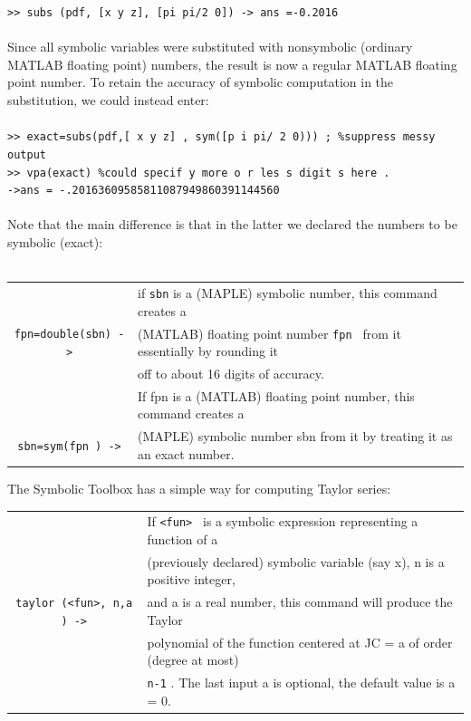 \documentclass[../main.tex]{subfiles}
\begin{document}
\texttt{>> subs (pdf, [x y z], [pi pi/2 0]) -> ans =-0.2016 }
\\
\\
Since all symbolic variables were substituted with nonsymbolic (ordinary 
MATLAB floating point) numbers, the result is now a regular MATLAB floating 
point number. To retain the accuracy of symbolic computation in the substitution, 
we could instead enter: 
\\
\\
\texttt{>> exact=subs(pdf,[ x y z] , sym([p i pi/ 2 0))) ; \%suppress messy output }\\
\texttt{>> vpa(exact) \%could specif y more o r les s digit s here . }\\
\texttt{->ans = -.20163609585811087949860391144560 }
\\
\\
Note that the main difference is that in the latter we declared the numbers to be 
symbolic (exact): 
\\
\\
\begin{center}
\begin{tabular}{|c|l|}
\hline
&if \texttt{sbn} is a (MAPLE) symbolic number, this command creates a\\
\texttt{fpn=double(sbn) ->}&(MATLAB) floating point number \texttt{fpn } from it essentially by rounding it \\
&off to about 16 digits of accuracy. \\
\hline
&If fpn is a (MATLAB) floating point number, this command creates a\\
\texttt{sbn=sym(fpn ) ->}&(MAPLE) symbolic number sbn from it by treating it as an exact number.\\
\hline
\end{tabular}
\end{center}
The Symbolic Toolbox has a simple way for computing Taylor series: \\
\begin{center}
\begin{tabular}{|c|l|}
\hline
&If \texttt{<fun> } is a symbolic expression representing a function of a\\
&(previously declared) symbolic variable (say x), n is a positive integer,\\
\texttt{taylor (<fun>, n,a ) ->}&and a is a real number, this command will produce the Taylor 
\\
&polynomial of the function centered at JC = a of order (degree at most)\\
&\texttt{n-1} . The last input a is optional, the default value is a = 0. \\
\hline
\end{tabular}
\end{center}
\end{document}
